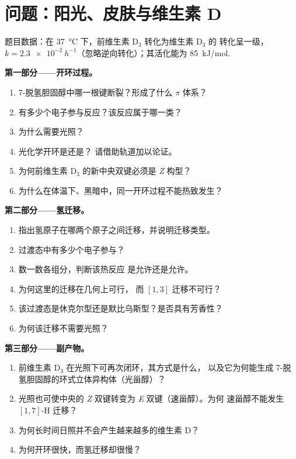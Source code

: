 \clearpage
\enlargethispage{3\baselineskip}
\section{问题：阳光、皮肤与维生素 D}

\begin{problem}
\label{pb:b3:pericyclic:1}
题目数据：在 \qty{37}{\celsius} 下，前维生素 D$_3$ 转化为维生素 D$_3$ 的
转化呈一级，$k = \qty{2.3e-2}{h^{-1}}$（忽略逆向转化）；其活化能为
\qty{85}{kJ/mol}.

\medskip\noindent\textbf{第一部分——开环过程。}
\begin{enumerate}
  \item 7-脱氢胆固醇中哪一根键断裂？形成了什么 $\pi$ 体系？
  \item 有多少个电子参与反应？该反应属于哪一类？
  \item 为什么需要光照？
  \item 光化学开环是还是？
        请借助轨道加以论证。
  \item 为何前维生素 D$_3$ 的新中央双键必须是 \textit{Z} 构型？
  \item 为什么在体温下、黑暗中，同一开环过程不能热致发生？
\end{enumerate}

\medskip\noindent\textbf{第二部分——氢迁移。}
\begin{enumerate}[resume]
  \item 指出氢原子在哪两个原子之间迁移，并说明迁移类型。
  \item 过渡态中有多少个电子参与？
  \item 数一数各组分，判断该热反应
        是允许还是允许。
  \item 为何这里的迁移在几何上可行，
        而 $[1,3]$ 迁移不可行？
  \item 该过渡态是休克尔型还是默比乌斯型？是否具有芳香性？
  \item 为何该迁移不需要光照？
\end{enumerate}

\medskip\noindent\textbf{第三部分——副产物。}
\begin{enumerate}[resume]
  \item 前维生素 D$_3$ 在光照下可再次闭环，其方式是什么，
        以及它为何能生成 7-脱氢胆固醇的环式立体异构体（光甾醇）？
  \item 光照也可使中央的 \textit{Z} 双键转变为 \textit{E} 双键（速甾醇）。为何
        速甾醇不能发生 $[1,7]$-H 迁移？
  \item 为何长时间日照并不会产生越来越多的维生素 D？
  \item 为何开环很快，而氢迁移却很慢？
\end{enumerate}


\end{problem}
